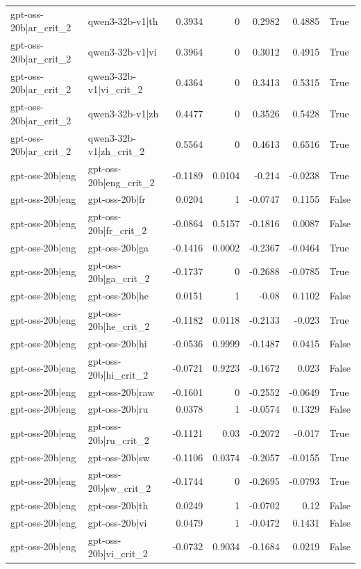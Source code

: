 \begin{table}
\begin{tabular}{l l r r r r l}
gpt-oss-20b|ar_crit_2 & qwen3-32b-v1|th & 0.3934 & 0 & 0.2982 & 0.4885 & True \\
gpt-oss-20b|ar_crit_2 & qwen3-32b-v1|vi & 0.3964 & 0 & 0.3012 & 0.4915 & True \\
gpt-oss-20b|ar_crit_2 & qwen3-32b-v1|vi_crit_2 & 0.4364 & 0 & 0.3413 & 0.5315 & True \\
gpt-oss-20b|ar_crit_2 & qwen3-32b-v1|zh & 0.4477 & 0 & 0.3526 & 0.5428 & True \\
gpt-oss-20b|ar_crit_2 & qwen3-32b-v1|zh_crit_2 & 0.5564 & 0 & 0.4613 & 0.6516 & True \\
gpt-oss-20b|eng & gpt-oss-20b|eng_crit_2 & -0.1189 & 0.0104 & -0.214 & -0.0238 & True \\
gpt-oss-20b|eng & gpt-oss-20b|fr & 0.0204 & 1 & -0.0747 & 0.1155 & False \\
gpt-oss-20b|eng & gpt-oss-20b|fr_crit_2 & -0.0864 & 0.5157 & -0.1816 & 0.0087 & False \\
gpt-oss-20b|eng & gpt-oss-20b|ga & -0.1416 & 0.0002 & -0.2367 & -0.0464 & True \\
gpt-oss-20b|eng & gpt-oss-20b|ga_crit_2 & -0.1737 & 0 & -0.2688 & -0.0785 & True \\
gpt-oss-20b|eng & gpt-oss-20b|he & 0.0151 & 1 & -0.08 & 0.1102 & False \\
gpt-oss-20b|eng & gpt-oss-20b|he_crit_2 & -0.1182 & 0.0118 & -0.2133 & -0.023 & True \\
gpt-oss-20b|eng & gpt-oss-20b|hi & -0.0536 & 0.9999 & -0.1487 & 0.0415 & False \\
gpt-oss-20b|eng & gpt-oss-20b|hi_crit_2 & -0.0721 & 0.9223 & -0.1672 & 0.023 & False \\
gpt-oss-20b|eng & gpt-oss-20b|raw & -0.1601 & 0 & -0.2552 & -0.0649 & True \\
gpt-oss-20b|eng & gpt-oss-20b|ru & 0.0378 & 1 & -0.0574 & 0.1329 & False \\
gpt-oss-20b|eng & gpt-oss-20b|ru_crit_2 & -0.1121 & 0.03 & -0.2072 & -0.017 & True \\
gpt-oss-20b|eng & gpt-oss-20b|sw & -0.1106 & 0.0374 & -0.2057 & -0.0155 & True \\
gpt-oss-20b|eng & gpt-oss-20b|sw_crit_2 & -0.1744 & 0 & -0.2695 & -0.0793 & True \\
gpt-oss-20b|eng & gpt-oss-20b|th & 0.0249 & 1 & -0.0702 & 0.12 & False \\
gpt-oss-20b|eng & gpt-oss-20b|vi & 0.0479 & 1 & -0.0472 & 0.1431 & False \\
gpt-oss-20b|eng & gpt-oss-20b|vi_crit_2 & -0.0732 & 0.9034 & -0.1684 & 0.0219 & False \\

\end{tabular}
\end{table}
